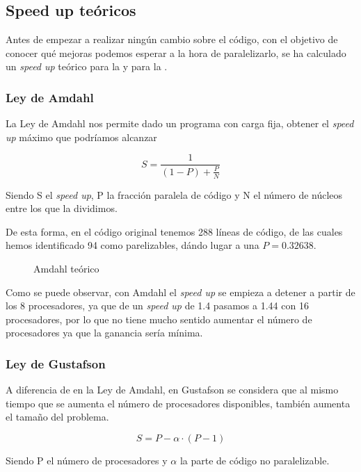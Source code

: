 \documentclass[12pt]{report} %
\begin{document}
\subsection{Speed up teóricos}

Antes de empezar a realizar ningún cambio sobre el código, con el objetivo de conocer qué mejoras
podemos esperar a la hora de paralelizarlo, se ha calculado un \textit{speed up} teórico para
la  y para la .

\subsubsection{Ley de Amdahl}
\label{sec:Amdahl}

La Ley de Amdahl nos permite dado un programa con carga fija, obtener el \textit{speed up} máximo que podríamos alcanzar

\[ S = \frac{1}{(1 - P) + \frac{P}{N}} \]

Siendo S el \textit{speed up}, P la fracción paralela de código y N el número de núcleos entre
los que la dividimos.

De esta forma, en el código original tenemos 288 líneas de código, de las cuales hemos identificado
94 como parelizables, dándo lugar a una $P = 0.32638$.

\begin{figure}[H]
    \makebox[\textwidth][c]{
        
    }
    \caption{Amdahl teórico}
    \label{fig:ley_amdahl}
\end{figure}

Como se puede observar, con Amdahl el \textit{speed up} se empieza a detener a partir de los 8 procesadores,
ya que de un \textit{speed up} de 1.4 pasamos a 1.44 con 16 procesadores, por lo que no tiene mucho sentido
aumentar el número de procesadores ya que la ganancia sería mínima.


\subsubsection{Ley de Gustafson}
\label{sec:Gustafson}

A diferencia de en la Ley de Amdahl, en Gustafson se considera que al mismo tiempo que se aumenta el número
de procesadores disponibles, también aumenta el tamaño del problema.

\[ S = P - \alpha \cdot (P - 1)\]

Siendo P el número de procesadores y $\alpha$ la parte de código no paralelizable.
\end{document}
